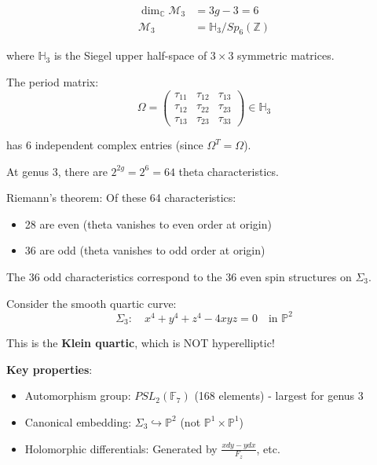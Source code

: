 \begin{definition}
\label{def:moduli-g3}
\begin{align}
\dim_{\mathbb{C}} \mathcal{M}_3 &= 3g - 3 = 6 \\
\mathcal{M}_3 &= \mathbb{H}_3 / Sp_6(\mathbb{Z})
\end{align}

where $\mathbb{H}_3$ is the Siegel upper half-space of $3 \times 3$ symmetric matrices.

The period matrix:
\begin{equation}
\Omega = \begin{pmatrix}
\tau_{11} & \tau_{12} & \tau_{13} \\
\tau_{12} & \tau_{22} & \tau_{23} \\
\tau_{13} & \tau_{23} & \tau_{33}
\end{pmatrix} \in \mathbb{H}_3
\end{equation}

has $6$ independent complex entries (since $\Omega^T = \Omega$).
\end{definition}

\begin{theorem}
\label{thm:theta-g3}
At genus 3, there are $2^{2g} = 2^6 = 64$ theta characteristics.

Riemann's theorem: Of these 64 characteristics:
\begin{itemize}
\item 28 are even (theta vanishes to even order at origin)
\item 36 are odd (theta vanishes to odd order at origin)
\end{itemize}

The 36 odd characteristics correspond to the 36 even spin structures on $\Sigma_3$.
\end{theorem}

\begin{example}
\label{ex:klein-quartic-g3}
Consider the smooth quartic curve:
\begin{equation}
\Sigma_3: \quad x^4 + y^4 + z^4 - 4xyz = 0 \quad \text{in } \mathbb{P}^2
\end{equation}

This is the \textbf{Klein quartic}, which is NOT hyperelliptic!

\textbf{Key properties}:
\begin{itemize}
\item Automorphism group: $PSL_2(\mathbb{F}_7)$ (168 elements) - largest for genus 3
\item Canonical embedding: $\Sigma_3 \hookrightarrow \mathbb{P}^2$ (not $\mathbb{P}^1 \times \mathbb{P}^1$)
\item Holomorphic differentials: Generated by $\frac{x dy - y dx}{F_z}$, etc.
\end{itemize}
\end{example}

